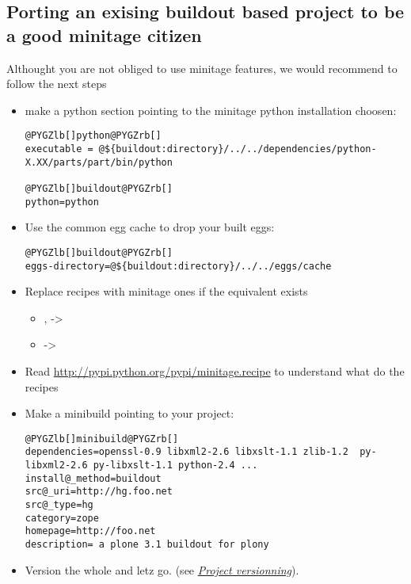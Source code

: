 \documentclass[letterpaper,10pt,english]{sphinxmanual}
\begin{document}
\subsection{Porting an exising buildout based project to be a good minitage citizen}
\label{usecases/maintain_project:porting-an-exising-buildout-based-project-to-be-a-good-minitage-citizen}\label{usecases/maintain_project::doc}
Althought you are not obliged to use minitage features, we would recommend to follow the next steps
\begin{itemize}
\item {} 
make a python section pointing to the minitage python installation choosen:

\begin{Verbatim}[commandchars=@\[\]]
@PYGZlb[]python@PYGZrb[]
executable = @${buildout:directory}/../../dependencies/python-X.XX/parts/part/bin/python

@PYGZlb[]buildout@PYGZrb[]
python=python
\end{Verbatim}

\item {} 
Use the common egg cache to drop your built eggs:

\begin{Verbatim}[commandchars=@\[\]]
@PYGZlb[]buildout@PYGZrb[]
eggs-directory=@${buildout:directory}/../../eggs/cache
\end{Verbatim}

\item {} 
Replace recipes with minitage ones if the equivalent exists
\begin{itemize}
\item {} 
,  -\textgreater{} 

\item {} 
 -\textgreater{} 

\end{itemize}

\item {} 
Read \href{http://pypi.python.org/pypi/minitage.recipe}{http://pypi.python.org/pypi/minitage.recipe} to understand what do the recipes

\item {} 
Make a minibuild pointing to your project:

\begin{Verbatim}[commandchars=@\[\]]
@PYGZlb[]minibuild@PYGZrb[]
dependencies=openssl-0.9 libxml2-2.6 libxslt-1.1 zlib-1.2  py-libxml2-2.6 py-libxslt-1.1 python-2.4 ...
install@_method=buildout
src@_uri=http://hg.foo.net
src@_type=hg
category=zope
homepage=http://foo.net
description= a plone 3.1 buildout for plony
\end{Verbatim}

\item {} 
Version the whole and letz go. (see {\hyperref[usecases/begin_project:versioning-project]{\emph{Project versionning}}}).

\end{itemize}
\end{document}

